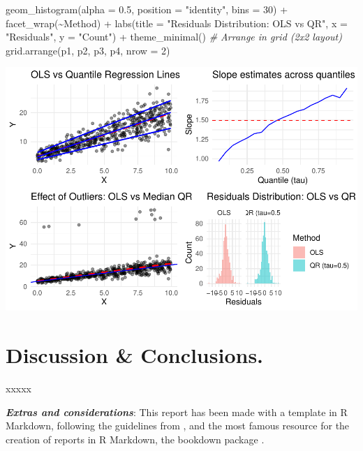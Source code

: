 \documentclass[fleqn,8pt]{latex/stylish_article} %
\newenvironment{Shaded}{\begin{snugshade}}{\end{snugshade}}
\newcommand{\DecValTok}[1]{\textcolor[rgb]{0.00,0.00,0.81}{{#1}}}
\newcommand{\FloatTok}[1]{\textcolor[rgb]{0.00,0.00,0.81}{{#1}}}
\newcommand{\SpecialCharTok}[1]{\textcolor[rgb]{0.00,0.00,0.00}{{#1}}}
\newcommand{\StringTok}[1]{\textcolor[rgb]{0.31,0.60,0.02}{{#1}}}
\newcommand{\CommentTok}[1]{\textcolor[rgb]{0.56,0.35,0.01}{\textit{{#1}}}}
\newcommand{\FunctionTok}[1]{\textcolor[rgb]{0.00,0.00,0.00}{{#1}}}
\newcommand{\AttributeTok}[1]{\textcolor[rgb]{0.77,0.63,0.00}{{#1}}}
\newcommand{\NormalTok}[1]{{#1}}
\begin{document}
\begin{Shaded}
\begin{Highlighting}[]
    \FunctionTok{geom\_histogram}\NormalTok{(}\AttributeTok{alpha =} \FloatTok{0.5}\NormalTok{, }\AttributeTok{position =} \StringTok{"identity"}\NormalTok{,}
        \AttributeTok{bins =} \DecValTok{30}\NormalTok{) }\SpecialCharTok{+} \FunctionTok{facet\_wrap}\NormalTok{(}\SpecialCharTok{\textasciitilde{}}\NormalTok{Method) }\SpecialCharTok{+} \FunctionTok{labs}\NormalTok{(}\AttributeTok{title =} \StringTok{"Residuals Distribution: OLS vs QR"}\NormalTok{,}
    \AttributeTok{x =} \StringTok{"Residuals"}\NormalTok{, }\AttributeTok{y =} \StringTok{"Count"}\NormalTok{) }\SpecialCharTok{+} \FunctionTok{theme\_minimal}\NormalTok{()}
\CommentTok{\# Arrange in grid (2x2 layout)}
\FunctionTok{grid.arrange}\NormalTok{(p1, p2, p3, p4, }\AttributeTok{nrow =} \DecValTok{2}\NormalTok{)}
\end{Highlighting}
\end{Shaded}

\begin{center}\includegraphics[width=0.8\linewidth]{ADR_project_files/figure-latex/other-plots-1} \end{center}

\section{Discussion \& Conclusions.}\label{discussion-conclusions.}

xxxxx

\textbf{\emph{Extras and considerations}}: This report has been made with a template in R Markdown, following the guidelines from \citep{Marcon2025}, and the most famous resource for the creation of reports in R Markdown, the bookdown package \citep{Xie2016}.



\makeatletter

\makeatother


\end{document}
